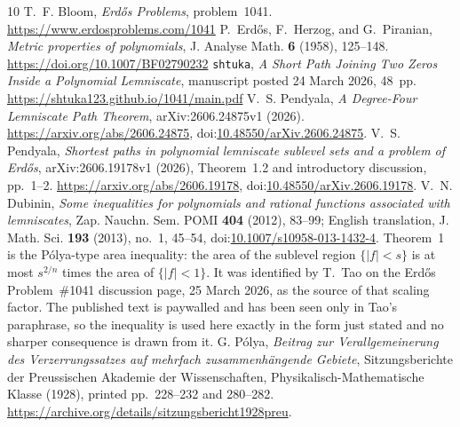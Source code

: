 \documentclass[11pt]{article}
\begin{document}
\begin{thebibliography}{10}
 T.~F. Bloom, \emph{Erd\H{o}s Problems}, problem~1041.
  \url{https://www.erdosproblems.com/1041}
 P.~Erd\H{o}s, F.~Herzog, and G.~Piranian,
  \emph{Metric properties of polynomials}, J. Analyse Math. \textbf{6}
  (1958), 125--148. \url{https://doi.org/10.1007/BF02790232}
 \texttt{shtuka},
  \emph{A Short Path Joining Two Zeros Inside a Polynomial Lemniscate},
  manuscript posted 24 March 2026, 48~pp.
  \url{https://shtuka123.github.io/1041/main.pdf}
 V.~S. Pendyala,
  \emph{A Degree-Four Lemniscate Path Theorem},
  arXiv:2606.24875v1 (2026).
  \url{https://arxiv.org/abs/2606.24875},
  doi:\href{https://doi.org/10.48550/arXiv.2606.24875}
  {10.48550/arXiv.2606.24875}.
 V.~S. Pendyala,
  \emph{Shortest paths in polynomial lemniscate sublevel sets and a problem
  of Erd\H{o}s}, arXiv:2606.19178v1 (2026),
  Theorem~1.2 and introductory discussion, pp.~1--2.
  \url{https://arxiv.org/abs/2606.19178},
  doi:\href{https://doi.org/10.48550/arXiv.2606.19178}
  {10.48550/arXiv.2606.19178}.
 V.~N. Dubinin, \emph{Some inequalities for polynomials and
  rational functions associated with lemniscates}, Zap. Nauchn. Sem. POMI
  \textbf{404} (2012), 83--99; English translation, J. Math. Sci. \textbf{193}
  (2013), no.~1, 45--54,
  doi:\href{https://doi.org/10.1007/s10958-013-1432-4}{10.1007/s10958-013-1432-4}.
  Theorem~1 is the P\'olya-type area inequality: the area of the sublevel
  region $\{|f|<s\}$ is at most $s^{2/n}$ times the area of $\{|f|<1\}$.  It
  was identified by T.~Tao on the Erd\H{o}s Problem~\#1041 discussion page,
  25 March 2026, as the source of that scaling factor.  The published text is
  paywalled and has been seen only in Tao's paraphrase, so the inequality is
  used here exactly in the form just stated and no sharper consequence is
  drawn from it.
 G. P\'olya,
  \emph{Beitrag zur Verallgemeinerung des Verzerrungssatzes auf mehrfach
  zusammenh\"angende Gebiete}, Sitzungsberichte der Preussischen Akademie der
  Wissenschaften, Physikalisch-Mathematische Klasse (1928), printed
  pp.~228--232 and 280--282.
  \url{https://archive.org/details/sitzungsbericht1928preu}.
\end{thebibliography}
\end{document}
